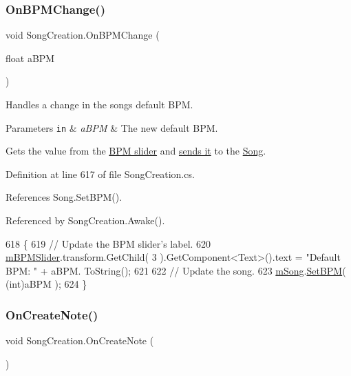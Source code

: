 \subsubsection{\texorpdfstring{On\+B\+P\+M\+Change()}{OnBPMChange()}}
{\footnotesize\ttfamily void Song\+Creation.\+On\+B\+P\+M\+Change (\begin{DoxyParamCaption}\item[{float}]{a\+B\+PM }\end{DoxyParamCaption})}



Handles a change in the song\textquotesingle{}s default B\+PM. 


\begin{DoxyParams}[1]{Parameters}
\mbox{\tt in}  & {\em a\+B\+PM} & The new default B\+PM.\\
\hline
\end{DoxyParams}
Gets the value from the \hyperlink{group___s_c_priv_var_ga6f751fe7fc31196eeec490cdbc679baa}{B\+PM slider} and \hyperlink{group___song_const_gaa65bbba1af7192edff7e0f848029013b}{sends it} to the \hyperlink{group___s_c_priv_var_ga9554e9b3758d1cc1e841a5f7d8aa9f56}{Song}. 

Definition at line 617 of file Song\+Creation.\+cs.



References Song.\+Set\+B\+P\+M().



Referenced by Song\+Creation.\+Awake().


\begin{DoxyCode}
618     \{
619         \textcolor{comment}{// Update the BPM slider's label.}
620         \hyperlink{group___s_c_priv_var_ga6f751fe7fc31196eeec490cdbc679baa}{mBPMSlider}.transform.GetChild( 3 ).GetComponent<Text>().text = \textcolor{stringliteral}{"Default BPM: "} + aBPM.
      ToString();
621 
622         \textcolor{comment}{// Update the song.}
623         \hyperlink{group___s_c_priv_var_ga9554e9b3758d1cc1e841a5f7d8aa9f56}{mSong}.\hyperlink{group___song_const_gaa65bbba1af7192edff7e0f848029013b}{SetBPM}( (\textcolor{keywordtype}{int})aBPM );
624     \}
\end{DoxyCode}
\mbox{\label{group___s_c_handlers_ga70f2fdac755a6b62f48afd96f2446d71}} 
\subsubsection{\texorpdfstring{On\+Create\+Note()}{OnCreateNote()}}
{\footnotesize\ttfamily void Song\+Creation.\+On\+Create\+Note (\begin{DoxyParamCaption}{ }\end{DoxyParamCaption})}



